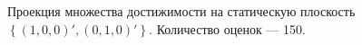 \documentclass[10pt, a4paper]{article}
\begin{document}
\begin{figure}[H]
\caption{Проекция множества достижимости на статическую плоскость $\left\{(1,0,0)',(0,1,0)'\right\}$. Количество оценок --- 150.}
\end{figure}
\end{document}
